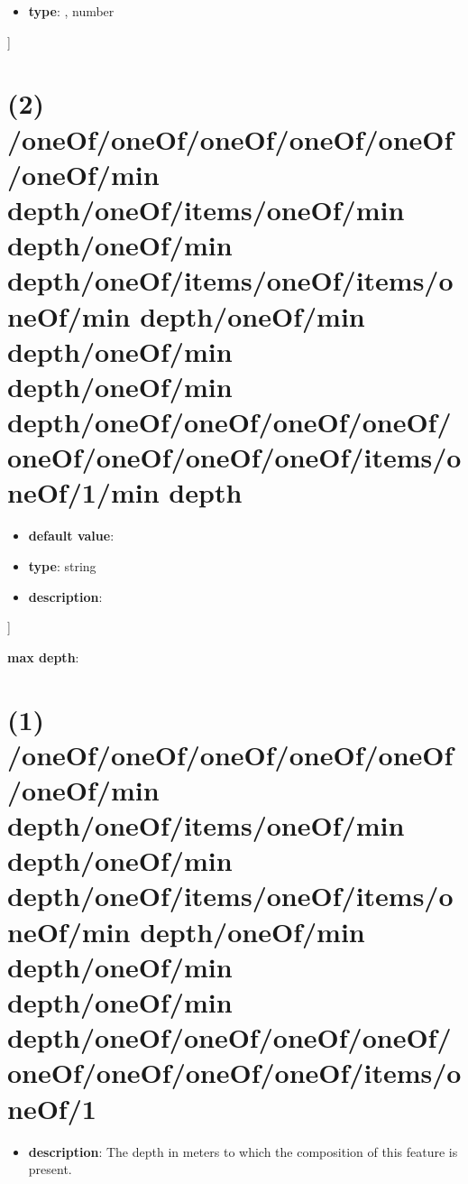 \begin{itemize}[leftmargin=7em]\item {\bf type}: , number\end{itemize}]\section{(2) /oneOf/oneOf/oneOf/oneOf/oneOf/oneOf/min depth/oneOf/items/oneOf/min depth/oneOf/min depth/oneOf/items/oneOf/items/oneOf/min depth/oneOf/min depth/oneOf/min depth/oneOf/min depth/oneOf/oneOf/oneOf/oneOf/oneOf/oneOf/oneOf/oneOf/items/oneOf/1/min depth}
\begin{itemize}[leftmargin=2em]\item {\bf default value}: 
\item {\bf type}: string
\item {\bf description}: 
\end{itemize}]\item {\bf max depth}: \section{(1) /oneOf/oneOf/oneOf/oneOf/oneOf/oneOf/min depth/oneOf/items/oneOf/min depth/oneOf/min depth/oneOf/items/oneOf/items/oneOf/min depth/oneOf/min depth/oneOf/min depth/oneOf/min depth/oneOf/oneOf/oneOf/oneOf/oneOf/oneOf/oneOf/oneOf/items/oneOf/1}
\begin{itemize}[leftmargin=1em]\item {\bf description}: The depth in meters to which the composition of this feature is present.
\end{itemize}
